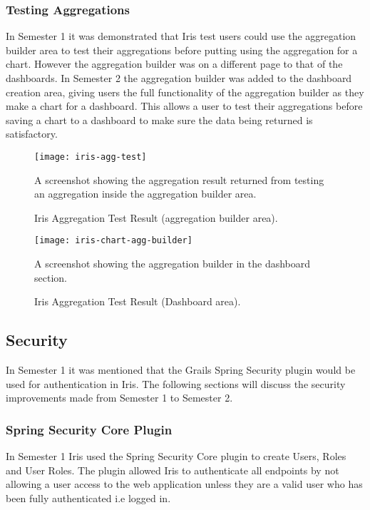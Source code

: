 \documentclass[12pt,a4paper,titlepage]{report}
\begin{document}
\subsubsection{Testing Aggregations}
In Semester 1 it was demonstrated that Iris test users could use the aggregation builder area to test their aggregations before putting using the aggregation for a chart. However the aggregation builder was on a different page to that of the dashboards. In Semester 2 the aggregation builder was added to the dashboard creation area, giving users the full functionality of the aggregation builder as they make a chart for a dashboard. This allows a user to test their aggregations before saving a chart to a dashboard to make sure the data being returned is satisfactory.

\begin{figure}[H]
\begin{tcolorbox}
\begin{center}
\texttt{[image: iris-agg-test]}
\end{center}
A screenshot showing the aggregation result returned from testing an aggregation inside the aggregation builder area.
\end{tcolorbox}
\caption{Iris Aggregation Test Result (aggregation builder area).}
\end{figure}

\begin{figure}[H]
\begin{tcolorbox}
\begin{center}
\texttt{[image: iris-chart-agg-builder]}
\end{center}
A screenshot showing the aggregation builder in the dashboard section.
\end{tcolorbox}
\caption{Iris Aggregation Test Result (Dashboard area).}
\end{figure}
\subsection{Security}
In Semester 1 it was mentioned that the Grails Spring Security plugin would be used for authentication in Iris. The following sections will discuss the security improvements made from Semester 1 to Semester 2.

\subsubsection{Spring Security Core Plugin}
In Semester 1 Iris used the Spring Security Core plugin to create Users, Roles and User Roles. The plugin allowed Iris to authenticate all endpoints by not allowing a user access to the web application unless they are a valid user who has been fully authenticated i.e logged in.
\end{document}
